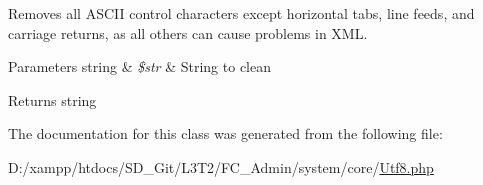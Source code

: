 Removes all A\+S\+C\+I\+I control characters except horizontal tabs, line feeds, and carriage returns, as all others can cause problems in X\+M\+L.


\begin{DoxyParams}[1]{Parameters}
string & {\em \$str} & String to clean \\
\hline
\end{DoxyParams}
\begin{DoxyReturn}{Returns}
string 
\end{DoxyReturn}


The documentation for this class was generated from the following file\+:\begin{DoxyCompactItemize}
\item 
D\+:/xampp/htdocs/\+S\+D\+\_\+\+Git/\+L3\+T2/\+F\+C\+\_\+\+Admin/system/core/\hyperlink{system_2core_2_utf8_8php}{Utf8.\+php}\end{DoxyCompactItemize}
